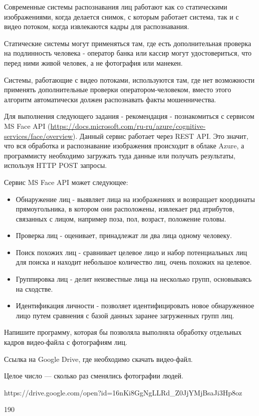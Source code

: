 
Современные системы распознавания лиц работают как со статическими изображениями, когда делается снимок, с которым работает система, так и с видео потоком, когда извлекаются кадры для распознавания.

Статические системы могут применяться там, где есть дополнительная проверка на подлинность человека - оператор банка или кассир могут удостовериться, что перед ними живой человек, а не фотография или манекен.

Системы, работающие с видео потоками, используются там, где нет возможности применять дополнительные проверки оператором-человеком, вместо этого алгоритм автоматически должен распознавать факты мошенничества.

Для выполнения следующего задания - рекомендация - познакомиться с сервисом MS Face API (\url{https://docs.microsoft.com/ru-ru/azure/cognitive-services/face/overview}). Данный сервис работает через REST API. Это значит, что вся обработка и распознавание изображения происходит в облаке Azure, а программисту необходимо загружать туда данные или получать результаты, используя HTTP POST запросы.

Сервис MS Face API может следующее:

\begin{itemize}
    \item Обнаружение лиц - выявляет лица на изображениях и возвращает координаты прямоугольника, в котором они расположены, извлекает ряд атрибутов, связанных с лицом, например поза, пол, возраст, положение головы.
    \item Проверка лиц - оценивает, принадлежат ли два лица одному человеку.
    \item Поиск похожих лиц - сравнивает целевое лицо и набор потенциальных лиц для поиска и находит небольшое количество лиц, очень похожих на целевое.
    \item Группировка лиц - делит неизвестные лица на несколько групп, основываясь на сходстве.
    \item Идентификация личности - позволяет идентифицировать новое обнаруженное лицо путем сравнения с базой данных заранее загруженных групп лиц.
\end{itemize}

Напишите программу, которая бы позволяла выполняла обработку отдельных кадров видео-файла с фотографиям лиц.


Ссылка на Google Drive, где необходимо скачать видео-файл.

\outputfmtSection

Целое число --- сколько раз сменялись фотографии людей.

\begin{myverbbox}[\small]{\vinput} 
    https://drive.google.com/open?id=16nKi8GgNgLLRd_Z0JjYMjBsaJi3Hp8oz
\end{myverbbox}
\begin{myverbbox}[\small]{\voutput}
    190
\end{myverbbox}

